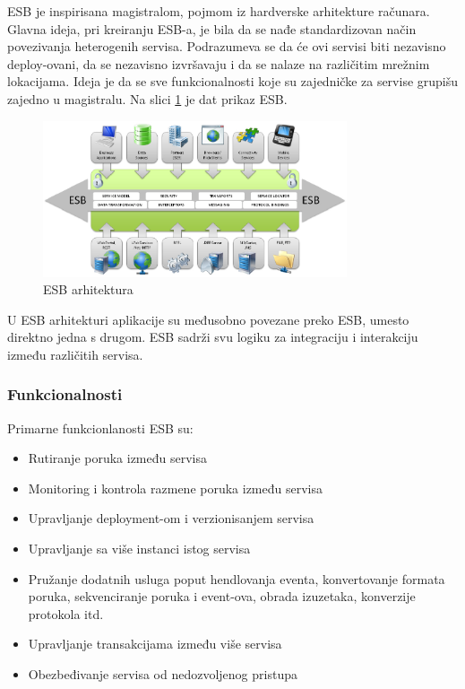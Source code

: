 \documentclass[a4paper,12pt]{report}
\begin{document}
ESB je inspirisana magistralom, pojmom iz hardverske arhitekture računara. Glavna ideja, pri kreiranju ESB-a, je bila da se nađe standardizovan način povezivanja heterogenih servisa. Podrazumeva se da će ovi servisi biti nezavisno deploy-ovani, da se nezavisno izvršavaju i da se nalaze na različitim mrežnim lokacijama. Ideja je da se sve funkcionalnosti koje su zajedničke za servise grupišu zajedno u magistralu. Na slici \ref{fig:esb-architecture} je dat prikaz ESB. \newline

\begin{figure}[h]
    \centering
    \includegraphics[width=0.8\textwidth]{esb_architecture}
    \caption{ESB arhitektura}
    \label{fig:esb-architecture}
\end{figure}

U ESB arhitekturi aplikacije su međusobno povezane preko ESB, umesto direktno jedna s drugom. ESB sadrži svu logiku za integraciju i interakciju između različitih servisa. 

\subsubsection{Funkcionalnosti}

Primarne funkcionlanosti ESB su:

\begin{itemize}
	\item Rutiranje poruka između servisa
	\item Monitoring i kontrola razmene poruka između servisa
	\item Upravljanje deployment-om i verzionisanjem servisa
	\item Upravljanje sa više instanci istog servisa
	\item Pružanje dodatnih usluga poput hendlovanja eventa, konvertovanje formata poruka, sekvenciranje poruka i event-ova, obrada izuzetaka, konverzije protokola itd. 
      \item Upravljanje transakcijama između više servisa
	\item Obezbeđivanje servisa od nedozvoljenog pristupa
\end{itemize}
\end{document}
